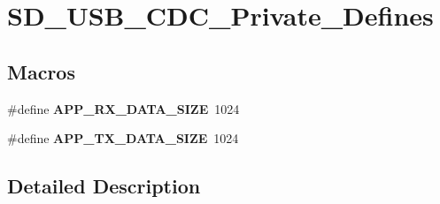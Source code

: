 \hypertarget{group___s_d___u_s_b___c_d_c___private___defines}{}\section{S\+D\+\_\+\+U\+S\+B\+\_\+\+C\+D\+C\+\_\+\+Private\+\_\+\+Defines}
\label{group___s_d___u_s_b___c_d_c___private___defines}
\subsection*{Macros}
\begin{DoxyCompactItemize}
\item 
\mbox{\label{group___s_d___u_s_b___c_d_c___private___defines_gaf3db03a3d03a80e1ec7a0a9c470d9692}} 
\#define {\bfseries A\+P\+P\+\_\+\+R\+X\+\_\+\+D\+A\+T\+A\+\_\+\+S\+I\+ZE}~1024
\item 
\mbox{\label{group___s_d___u_s_b___c_d_c___private___defines_gaff35924b436331d533599db9489c79ee}} 
\#define {\bfseries A\+P\+P\+\_\+\+T\+X\+\_\+\+D\+A\+T\+A\+\_\+\+S\+I\+ZE}~1024
\end{DoxyCompactItemize}


\subsection{Detailed Description}

